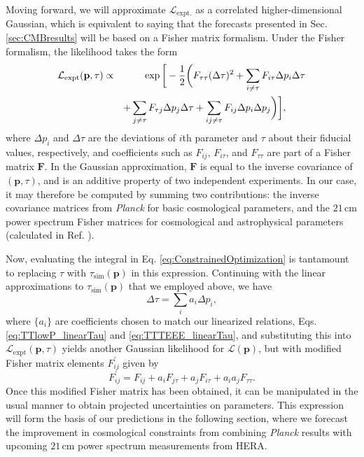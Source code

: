 \documentclass[twocolumn,aps,prd,nofootinbib,showpacs,superscriptaddress]{revtex4-1}
\begin{document}
Moving forward, we will approximate $\mathcal{L}_\textrm{expt.}$ as a correlated higher-dimensional Gaussian, which is equivalent to saying that the forecasts presented in Sec. \ref{sec:CMBresults} will be based on a Fisher matrix formalism. Under the Fisher formalism, the likelihood takes the form
\begin{eqnarray}
\mathcal{L}_\textrm{expt} ( \mathbf{p}, \tau) \propto &&\,\, \exp \bigg{[}-\frac{1}{2} \bigg{(}F_{\tau \tau} (\Delta \tau)^2  + \sum_{i \neq \tau} F_{i \tau} \Delta p_i \Delta \tau \nonumber \\
&& + \sum_{j \neq \tau} F_{\tau j} \Delta p_j \Delta \tau  + \sum_{ij \neq \tau}F_{ij} \Delta p_i \Delta p_j \bigg{ )}\bigg{]}, \qquad
\end{eqnarray}
where $\Delta p_i$ and $ \Delta \tau$ are the deviations of $i$th parameter and $\tau$ about their fiducial values, respectively, and coefficients such as $F_{ij}$, $F_{i\tau}$, and $F_{\tau \tau}$ are part of a Fisher matrix $\mathbf{F}$. In the Gaussian approximation, $\mathbf{F}$ is equal to the inverse covariance of $( \mathbf{p},  \tau)$, and is an additive property of two independent experiments. In our case, it may therefore be computed by summing two contributions: the inverse covariance matrices from \emph{Planck} for basic cosmological parameters, and the $21\,\textrm{cm}$ power spectrum Fisher matrices for cosmological and astrophysical parameters (calculated in Ref. \cite{Liu_in_prep}).

Now, evaluating the integral in Eq. \eqref{eq:ConstrainedOptimization} is tantamount to replacing $\tau$ with $\tau_\textrm{sim} (\mathbf{p})$ in this expression. Continuing with the linear approximations to $\tau_\textrm{sim} (\mathbf{p})$ that we employed above, we have
\begin{equation}
\Delta \tau = \sum_i a_i \Delta p_i,
\end{equation}
where $\{a_i \}$ are coefficients chosen to match our linearized relations, Eqs. \eqref{eq:TTlowP_linearTau} and \eqref{eq:TTTEEE_linearTau}, and substituting this into $\mathcal{L}_\textrm{expt} ( \mathbf{p}, \tau)$ yields another Gaussian likelihood for $\mathcal{L} (\mathbf{p})$, but with modified Fisher matrix elements $F^\prime_{ij}$ given by
\begin{equation}
\label{eq:newFisher}
F^\prime_{ij} = F_{ij} + a_i F_{j \tau} + a_j F_{i \tau} + a_i a_j F_{\tau \tau}.
\end{equation}
Once this modified Fisher matrix has been obtained, it can be manipulated in the usual manner to obtain projected uncertainties on parameters. This expression will form the basis of our predictions in the following section, where we forecast the improvement in cosmological constraints from combining \emph{Planck} results with upcoming $21\,\textrm{cm}$ power spectrum measurements from HERA.
\end{document}
